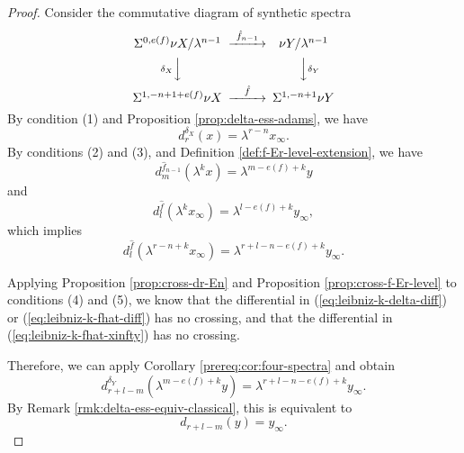 \begin{proof}
    Consider the commutative diagram of synthetic spectra
    $$\begin{CD}
        \Sus^{0,e(f)}\nu X/\lambda^{n-1} @>{\hat f_{n-1}}>> \nu Y/\lambda^{n-1} \\
        @V{\delta_X}VV @VV{\delta_Y}V \\
        \Sus^{1,-n+1+e(f)} \nu X @>{\hat f}>> \Sus^{1,-n+1}\nu Y
    \end{CD}$$
    By condition (1) and Proposition \ref{prop:delta-ess-adams}, we have
    \begin{equation}\label{eq:leibniz-k-delta-diff}
        d^{\delta_X}_r(x)=\lambda^{r-n}x_\infty.
    \end{equation}
    By conditions (2) and (3), and Definition \ref{def:f-Er-level-extension}, we have
    \begin{equation}\label{eq:leibniz-k-fhat-diff}
        d^{\hat f_{n-1}}_m(\lambda^k x)=\lambda^{m-e(f)+k} y
    \end{equation}
    and
    \begin{equation*}
        d^{\hat f}_l(\lambda^k x_\infty)=\lambda^{l-e(f)+k} y_\infty,
    \end{equation*}
    which implies
    \begin{equation}\label{eq:leibniz-k-fhat-xinfty}
         d^{\hat f}_l(\lambda^{r-n+k}x_\infty)=\lambda^{r+l-n-e(f)+k}y_\infty.
    \end{equation}

    Applying Proposition \ref{prop:cross-dr-En} and Proposition \ref{prop:cross-f-Er-level} to conditions (4) and (5), we know that the differential in (\ref{eq:leibniz-k-delta-diff}) or (\ref{eq:leibniz-k-fhat-diff}) has no crossing, and that the differential in (\ref{eq:leibniz-k-fhat-xinfty}) has no crossing.

    Therefore, we can apply Corollary \ref{prereq:cor:four-spectra} and obtain
    $$d^{\delta_Y}_{r+l-m}(\lambda^{m-e(f)+k} y)=\lambda^{r+l-n-e(f)+k} y_\infty.$$
    By Remark \ref{rmk:delta-ess-equiv-classical}, this is equivalent to
    $$d_{r+l-m}(y)= y_\infty.$$
\end{proof}

